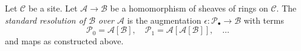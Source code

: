 \begin{definition}
\label{definition-standard-resolution-sheaves-rings}
Let $\mathcal{C}$ be a site.
Let $\mathcal{A} \to \mathcal{B}$ be a homomorphism of sheaves of rings
on $\mathcal{C}$. The {\it standard resolution of $\mathcal{B}$ over
$\mathcal{A}$} is the augmentation
$\epsilon : \mathcal{P}_\bullet \to \mathcal{B}$
with terms
$$
\mathcal{P}_0 = \mathcal{A}[\mathcal{B}],\quad
\mathcal{P}_1 = \mathcal{A}[\mathcal{A}[\mathcal{B}]],\quad \ldots
$$
and maps as constructed above.
\end{definition}